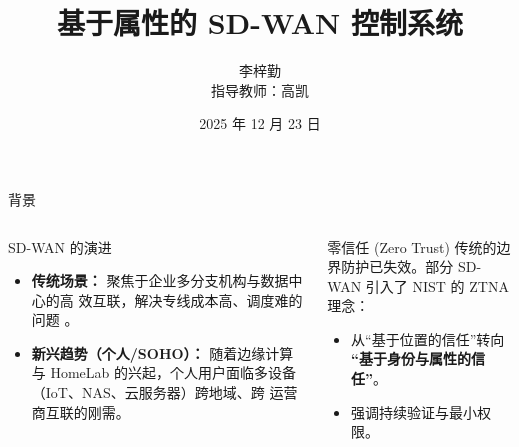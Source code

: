 \documentclass[aspectratio=169, 10pt]{beamer}
\title{基于属性的 SD-WAN 控制系统}
\author[李梓勤]{李梓勤 \\ 指导教师：高凯}
\institute[SCU]{四川大学网络空间安全学院}
\date{2025 年 12 月 23 日}
\begin{document}
\frame{\titlepage}

\begin{frame}{背景}
    \begin{columns}
        \begin{block}{SD-WAN 的演进}
            \begin{itemize}
                \item \textbf{传统场景：} 聚焦于企业多分支机构与数据中心的高
                    效互联，解决专线成本高、调度难的问题
                    \cite{Jain2013, Hong2013, ONF2014}。
                \item \textbf{新兴趋势（个人/SOHO）：} 随着边缘计算与 HomeLab
                    的兴起，个人用户面临多设备（IoT、NAS、云服务器）跨地域、跨
                    运营商互联的刚需。
            \end{itemize}
        \end{block}

        \begin{alertblock}{零信任 (Zero Trust)}
            传统的边界防护已失效。部分 SD-WAN 引入了 NIST 的 ZTNA \cite{NIST2020} 理念：
            \begin{itemize}
                \item 从“基于位置的信任”转向 \textbf{“基于身份与属性的信任”}。
                \item 强调持续验证与最小权限。
            \end{itemize}
        \end{alertblock}
    \end{columns}

    \vspace{0.5em}
\end{frame}
\end{document}
